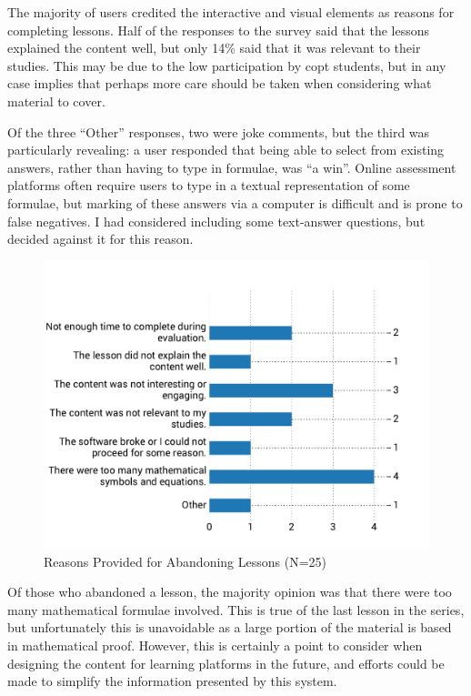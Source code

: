 \documentclass[bsc,twoside,singlespacing,parskip,logo,notimes,normalheadings]{infthesis}
\begin{document}
    The majority of users credited the interactive and visual elements
    as reasons for completing lessons. Half of the responses to the
    survey said that the lessons explained the content well, but only
    14\% said that it was relevant to their studies. This may be due
    to the low participation by \gls{copt} students, but in any case
    implies that perhaps more care should be taken when considering
    what material to cover.

    Of the three ``Other'' responses, two were joke comments, but the
    third was particularly revealing: a user responded that being able
    to select from existing answers, rather than having to type in
    formulae, was ``a win''. Online assessment platforms often require
    users to type in a textual representation of some formulae, but
    marking of these answers via a computer is difficult and is prone
    to false negatives. I had considered including some text-answer
    questions, but decided against it for this reason.

    \begin{figure}[!htb]
      \centering
      \vspace{-2mm}
      \includegraphics[width=\textwidth, trim=0 20 0 75, clip]{img/lesson_leaving.pdf}
      \captionsetup{width=\textwidth, justification=centering}
      \caption{Reasons Provided for Abandoning Lessons (N=25)}\label{fig:lesson-leave}
    \end{figure}

    Of those who abandoned a lesson, the majority opinion was that
    there were too many mathematical formulae involved. This is true
    of the last lesson in the series, but unfortunately this is
    unavoidable as a large portion of the material is based in
    mathematical proof. However, this is certainly a point to consider
    when designing the content for learning platforms in the future,
    and efforts could be made to simplify the information presented by
    this system.
\end{document}
